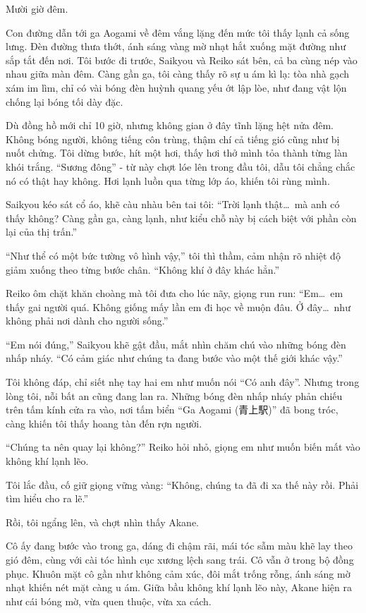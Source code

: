 \documentclass[../main.tex]{subfiles}
\begin{document}

Mười giờ đêm.

Con đường dẫn tới ga Aogami về đêm vắng lặng đến mức tôi thấy lạnh cả sống lưng. Đèn đường thưa thớt, ánh sáng vàng mờ nhạt hắt xuống mặt đường như sắp tắt đến nơi. Tôi bước đi trước, Saikyou và Reiko sát bên, cả ba cùng nép vào nhau giữa màn đêm. Càng gần ga, tôi càng thấy rõ sự u ám kì lạ: tòa nhà gạch xám im lìm, chỉ có vài bóng đèn huỳnh quang yếu ớt lập lòe, như đang vật lộn chống lại bóng tối dày đặc.

Dù đồng hồ mới chỉ 10 giờ, nhưng không gian ở đây tĩnh lặng hệt nửa đêm. Không bóng người, không tiếng côn trùng, thậm chí cả tiếng gió cũng như bị nuốt chửng. Tôi dừng bước, hít một hơi, thấy hơi thở mình tỏa thành từng làn khói trắng. ``Sương đông'' - từ này chợt lóe lên trong đầu tôi, dẫu tôi chẳng chắc nó có thật hay không. Hơi lạnh luồn qua từng lớp áo, khiến tôi rùng mình.

Saikyou kéo sát cổ áo, khẽ càu nhàu bên tai tôi: ``Trời lạnh thật\dots\ mà anh có thấy không? Càng gần ga, càng lạnh, như kiểu chỗ này bị cách biệt với phần còn lại của thị trấn.''

``Như thể có một bức tường vô hình vậy,'' tôi thì thầm, cảm nhận rõ nhiệt độ giảm xuống theo từng bước chân. ``Không khí ở đây khác hẳn.''

Reiko ôm chặt khăn choàng mà tôi đưa cho lúc nãy, giọng run run: ``Em\dots\ em thấy gai người quá. Không giống mấy lần em đi học về muộn đâu. Ở đây\dots\ như không phải nơi dành cho người sống.''

``Em nói đúng,'' Saikyou khẽ gật đầu, mắt nhìn chăm chú vào những bóng đèn nhấp nháy. ``Có cảm giác như chúng ta đang bước vào một thế giới khác vậy.''

Tôi không đáp, chỉ siết nhẹ tay hai em như muốn nói ``Có anh đây''. Nhưng trong lòng tôi, nỗi bất an cũng đang lan ra. Những bóng đèn nhấp nháy phản chiếu trên tấm kính cửa ra vào, nơi tấm biển ``Ga Aogami (青上駅)'' đã bong tróc, càng khiến tôi thấy hoang tàn đến rợn người.

``Chúng ta nên quay lại không?'' Reiko hỏi nhỏ, giọng em như muốn biến mất vào không khí lạnh lẽo.

Tôi lắc đầu, cố giữ giọng vững vàng: ``Không, chúng ta đã đi xa thế này rồi. Phải tìm hiểu cho ra lẽ.''

Rồi, tôi ngẩng lên, và chợt nhìn thấy Akane.


Cô ấy đang bước vào trong ga, dáng đi chậm rãi, mái tóc sẫm màu khẽ lay theo gió đêm, cùng với cài tóc hình cục xương lệch sang trái. Cô vẫn ở trong bộ đồng phục. Khuôn mặt cô gần như không cảm xúc, đôi mắt trống rỗng, ánh sáng mờ nhạt khiến nét mặt càng u ám. Giữa bầu không khí lạnh lẽo này, Akane hiện ra như cái bóng mờ, vừa quen thuộc, vừa xa cách.
\end{document}

